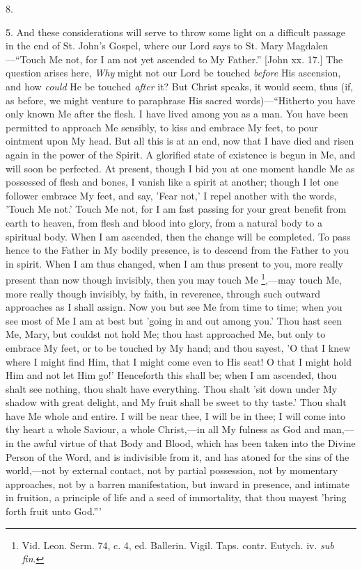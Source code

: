 8.

5. And these considerations will serve to throw some light on a
difficult passage in the end of St. John's Gospel, where our Lord says
to St. Mary Magdalen—``Touch Me not, for I am not yet ascended
to My Father.'' [John xx. 17.] The question arises here, \emph{Why}
might not our Lord be touched \emph{before} His ascension, and how \emph{could}
He be touched \emph{after} it? But Christ speaks, it would seem, thus
(if, as before, we might venture to paraphrase His sacred words)—``Hitherto
you have only known Me after the flesh. I have lived among you as a
man. You have been permitted to approach Me sensibly, to kiss and
embrace My feet, to pour ointment upon My head. But all this is at an
end, now that I have died and risen again in the power of the Spirit.
A glorified state of existence is begun in Me, and will soon be
perfected. At present, though I bid you at one moment handle Me as
possessed of flesh and bones, I vanish like a spirit at another;
though I let one follower embrace My feet, and say, 'Fear not,' I
repel another with the words, 'Touch Me not.' Touch Me not, for I am
fast passing for your great benefit from earth to heaven, from flesh
and blood into glory, from a natural body to a spiritual body. When I
am ascended, then the change will be completed. To pass hence to the
Father in My bodily presence, is to descend from the Father to
you in spirit. When I am thus changed, when I am thus present to you,
more really present than now though invisibly, then you may touch Me \footnote{Vid. Leon. Serm.
74, c. 4, ed. Ballerin. Vigil. Taps. contr. Eutych. iv. \emph{sub fin}.},—may touch Me, more really though invisibly, by faith, in
reverence, through such outward approaches as I shall assign. Now you
but see Me from time to time; when you see most of Me I am at best but
'going in and out among you.' Thou hast seen Me, Mary, but couldst not
hold Me; thou hast approached Me, but only to embrace My feet, or to
be touched by My hand; and thou sayest, 'O that I knew where I might
find Him, that I might come even to His seat! O that I might hold Him
and not let Him go!' Henceforth this shall be; when I am ascended,
thou shalt see nothing, thou shalt have everything. Thou shalt 'sit
down under My shadow with great delight, and My fruit shall be sweet
to thy taste.' Thou shalt have Me whole and entire. I will be near
thee, I will be in thee; I will come into thy heart a whole Saviour, a
whole Christ,—in all My fulness as God and man,—in the awful
virtue of that Body and Blood, which has been taken into the Divine
Person of the Word, and is indivisible from it, and has atoned for the
sins of the world,—not by external contact, not by partial
possession, not by momentary approaches, not by a barren
manifestation, but inward in presence, and intimate in fruition, a
principle of life and a seed of immortality, that thou mayest 'bring
forth fruit unto God.'''

